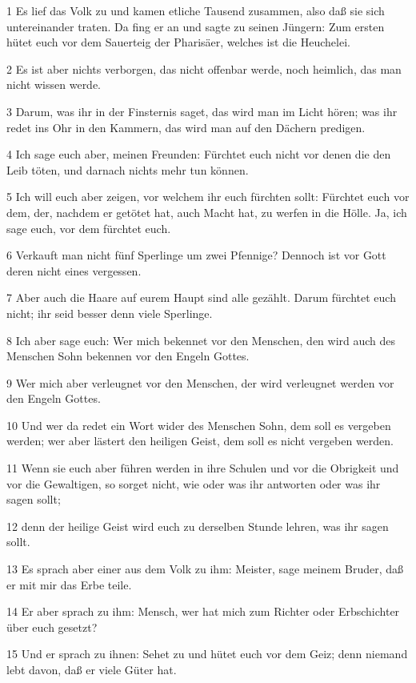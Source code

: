 \par 1 Es lief das Volk zu und kamen etliche Tausend zusammen, also daß sie sich untereinander traten. Da fing er an und sagte zu seinen Jüngern: Zum ersten hütet euch vor dem Sauerteig der Pharisäer, welches ist die Heuchelei.
\par 2 Es ist aber nichts verborgen, das nicht offenbar werde, noch heimlich, das man nicht wissen werde.
\par 3 Darum, was ihr in der Finsternis saget, das wird man im Licht hören; was ihr redet ins Ohr in den Kammern, das wird man auf den Dächern predigen.
\par 4 Ich sage euch aber, meinen Freunden: Fürchtet euch nicht vor denen die den Leib töten, und darnach nichts mehr tun können.
\par 5 Ich will euch aber zeigen, vor welchem ihr euch fürchten sollt: Fürchtet euch vor dem, der, nachdem er getötet hat, auch Macht hat, zu werfen in die Hölle. Ja, ich sage euch, vor dem fürchtet euch.
\par 6 Verkauft man nicht fünf Sperlinge um zwei Pfennige? Dennoch ist vor Gott deren nicht eines vergessen.
\par 7 Aber auch die Haare auf eurem Haupt sind alle gezählt. Darum fürchtet euch nicht; ihr seid besser denn viele Sperlinge.
\par 8 Ich aber sage euch: Wer mich bekennet vor den Menschen, den wird auch des Menschen Sohn bekennen vor den Engeln Gottes.
\par 9 Wer mich aber verleugnet vor den Menschen, der wird verleugnet werden vor den Engeln Gottes.
\par 10 Und wer da redet ein Wort wider des Menschen Sohn, dem soll es vergeben werden; wer aber lästert den heiligen Geist, dem soll es nicht vergeben werden.
\par 11 Wenn sie euch aber führen werden in ihre Schulen und vor die Obrigkeit und vor die Gewaltigen, so sorget nicht, wie oder was ihr antworten oder was ihr sagen sollt;
\par 12 denn der heilige Geist wird euch zu derselben Stunde lehren, was ihr sagen sollt.
\par 13 Es sprach aber einer aus dem Volk zu ihm: Meister, sage meinem Bruder, daß er mit mir das Erbe teile.
\par 14 Er aber sprach zu ihm: Mensch, wer hat mich zum Richter oder Erbschichter über euch gesetzt?
\par 15 Und er sprach zu ihnen: Sehet zu und hütet euch vor dem Geiz; denn niemand lebt davon, daß er viele Güter hat.
